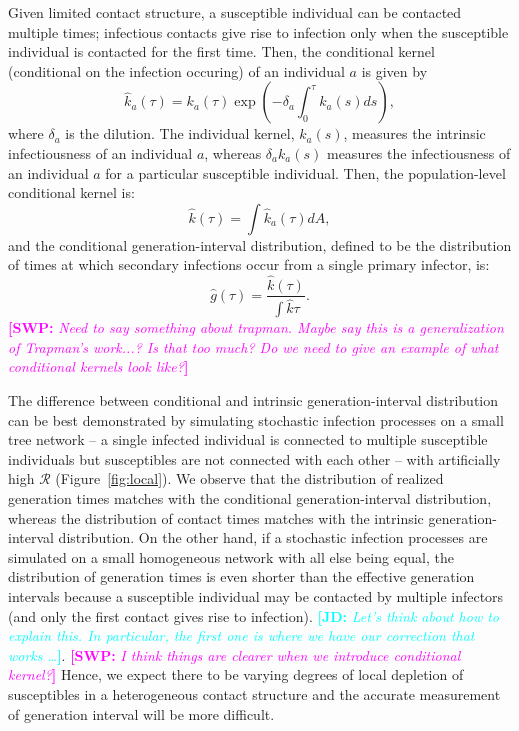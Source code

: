 \documentclass[12pt]{article}
\newcommand{\RR}{\ensuremath{{\mathcal R}}}
\newcommand{\comment}[3]{\textcolor{#1}{\textbf{[#2: }\textsl{#3}\textbf{]}}}
\newcommand{\jd}[1]{\comment{cyan}{JD}{#1}}
\newcommand{\swp}[1]{\comment{magenta}{SWP}{#1}}
\begin{document}
Given limited contact structure, a susceptible individual can be contacted multiple times;
infectious contacts give rise to infection only when the susceptible individual is contacted for the first time.
Then, the conditional kernel (conditional on the infection occuring) of an individual $a$ is given by
\begin{equation}
\hat{k}_a(\tau) = k_a(\tau) \exp \left(- \delta_a \int_0^\tau k_a(s) ds\right),
\end{equation}
where $\delta_a$ is the dilution.
The individual kernel, $k_a(s)$, measures the intrinsic infectiousness of an individual $a$,
whereas $\delta_a k_a(s)$ measures the infectiousness of an individual $a$ for a particular susceptible individual.
Then, the population-level conditional kernel is:
\begin{equation}
\hat{k}(\tau) = \int \hat{k}_a(\tau) dA,
\end{equation}
and the conditional generation-interval distribution, defined to be the distribution of times at which secondary infections occur from a single primary infector, is:
\begin{equation}
\hat{g}(\tau) = \frac{\hat{k}(\tau)}{\int \hat{k} \tau}.
\end{equation}
\swp{Need to say something about trapman. Maybe say this is a generalization of Trapman's work...? Is that too much? Do we need to give an example of what conditional kernels look like?}

The difference between conditional and intrinsic generation-interval distribution can be best demonstrated by simulating stochastic infection processes on a small tree network -- a single infected individual is connected to multiple susceptible individuals but susceptibles are not connected with each other -- with artificially high $\RR$ (Figure~\ref{fig:local}).
We observe that the distribution of realized generation times matches with the conditional generation-interval distribution, whereas the distribution of contact times matches with the intrinsic generation-interval distribution.
On the other hand, if a stochastic infection processes are simulated on a small homogeneous network with all else being equal, the distribution of generation times is even shorter than the effective generation intervals because a susceptible individual may be contacted by multiple infectors (and only the first contact gives rise to infection).
\jd{Let's think about how to explain this. In particular, the first one is where we have our correction that works \ldots}.
\swp{I think things are clearer when we introduce conditional kernel?}
Hence, we expect there to be varying degrees of local depletion of susceptibles in a heterogeneous contact structure and the accurate measurement of generation interval will be more difficult.
\end{document}
